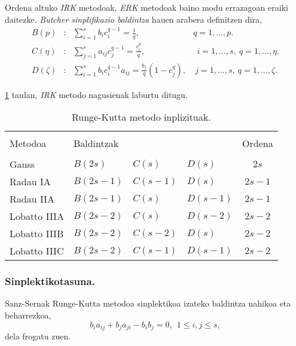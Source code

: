 Ordena altuko \emph{IRK} metodoak, \emph{ERK} metodoak baino modu errazagoan eraiki daitezke.  \emph{Butcher sinplifikazio baldintza} hauen \cite{Butcher2008} arabera definitzen dira,
\begin{align}
B(p) &: \ \ \ \sum\limits_{i=1}^{s} b_ic_i^{q-1} =\frac{1}{q}, \ \ & q=1,\dots,p. \\
C(\eta) &: \ \ \ \sum\limits_{j=1}^{s} a_{ij}c_j^{q-1}  =\frac{c_i^q}{q},& \ \ i=1,\dots,s, \ q=1,\dots,\eta.\\
D(\zeta) &:  \ \ \ \sum\limits_{i=1}^{s}  b_i c_i^{q-1}  a_{ij} = \frac{b_j}{q} (1-c_j^q),&  \ j=1,\dots,s, \  q=1,\dots,\zeta.
\end{align}

\ref{tab:irk} taulan, \emph{IRK} metodo nagusienak laburtu ditugu. 
\begin{table}[h]
\centering
\caption{Runge-Kutta metodo inplizituak.}
\label{tab:irk}       %
\begin{tabular}{ l l l l c } 
 \hline
 \\
 Metodoa          &  Baldintzak             &                        &                 & Ordena \\
 \\
 \hline
 Gauss            &  $B(2s)$                & $C(s)$                 & $D(s)$          & $2s$    \\
 Radau IA         &  $B(2s-1)$              & $C(s-1)$               & $D(s)$          & $2s-1$  \\
 Radau IIA        &  $B(2s-1)$             & $C(s)$                  & $D(s-1)$        & $2s-1$  \\
 Lobatto IIIA     &  $B(2s-2)$              & $C(s)$                 & $D(s-2)$        & $2s-2$  \\
 Lobatto IIIB     &  $B(2s-2)$              & $C(s-2)$               & $D(s)$          & $2s-2$  \\
 Lobatto IIIC     &  $B(2s-2)$              & $C(s-1)$               & $D(s-1)$        & $2s-2$  \\
  \hline
 \end{tabular}
\end{table}

\subsubsection*{Sinplektikotasuna.}

Sanz-Sernak  \cite{JMSanz-Serna1994} Runge-Kutta metodoa sinplektikoa izateko baldintza nahikoa eta beharrezkoa,
\begin{equation}
\label{eq:simplektik}
b_{i}a_{ij}+b_{j}a_{ji}-b_{i}b_{j}=0, \ \ 1 \leqslant i,j \leqslant s,
\end{equation}
dela frogatu zuen.

